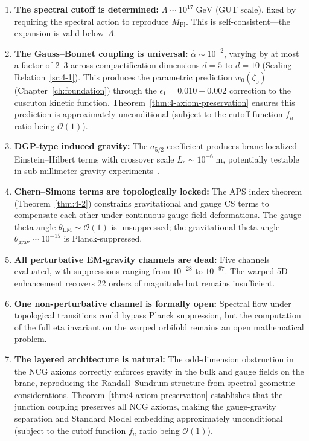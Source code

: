 \begin{enumerate}
  \item \textbf{The spectral cutoff is determined:} $\Lambda \sim 10^{17}\;\mathrm{GeV}$ (GUT scale), fixed by requiring the spectral action to reproduce $M_{\mathrm{Pl}}$. This is self-consistent---the expansion is valid below~$\Lambda$.

  \item \textbf{The Gauss--Bonnet coupling is universal:} $\hat{\alpha} \sim 10^{-2}$, varying by at most a factor of 2--3 across compactification dimensions $d = 5$ to $d = 10$ (Scaling Relation~\ref{sr:4-1}). This produces the parametric prediction $w_0(\zeta_0)$ (Chapter~\ref{ch:foundation}) through the $\epsilon_1 = 0.010 \pm 0.002$ correction to the cuscuton kinetic function. Theorem~\ref{thm:4-axiom-preservation} ensures this prediction is approximately unconditional (subject to the cutoff function $f_n$ ratio being $\mathcal{O}(1)$).

  \item \textbf{DGP-type induced gravity:} The $a_{5/2}$ coefficient produces brane-localized Einstein--Hilbert terms with crossover scale $L_c \sim 10^{-6}\;\mathrm{m}$, potentially testable in sub-millimeter gravity experiments~\cite{ch4:Kapner2007}.

  \item \textbf{Chern--Simons terms are topologically locked:} The APS index theorem (Theorem~\ref{thm:4-2}) constrains gravitational and gauge CS terms to compensate each other under continuous gauge field deformations. The gauge theta angle $\theta_{\mathrm{EM}} \sim \mathcal{O}(1)$ is unsuppressed; the gravitational theta angle $\theta_{\mathrm{grav}} \sim 10^{-15}$ is Planck-suppressed.

  \item \textbf{All perturbative EM-gravity channels are dead:} Five channels evaluated, with suppressions ranging from $10^{-28}$ to $10^{-97}$. The warped 5D enhancement recovers 22 orders of magnitude but remains insufficient.

  \item \textbf{One non-perturbative channel is formally open:} Spectral flow under topological transitions could bypass Planck suppression, but the computation of the full eta invariant on the warped orbifold remains an open mathematical problem.

  \item \textbf{The layered architecture is natural:} The odd-dimension obstruction in the NCG axioms correctly enforces gravity in the bulk and gauge fields on the brane, reproducing the Randall--Sundrum structure from spectral-geometric considerations. Theorem~\ref{thm:4-axiom-preservation} establishes that the junction coupling preserves all NCG axioms, making the gauge-gravity separation and Standard Model embedding approximately unconditional (subject to the cutoff function $f_n$ ratio being $\mathcal{O}(1)$).


\end{enumerate}
